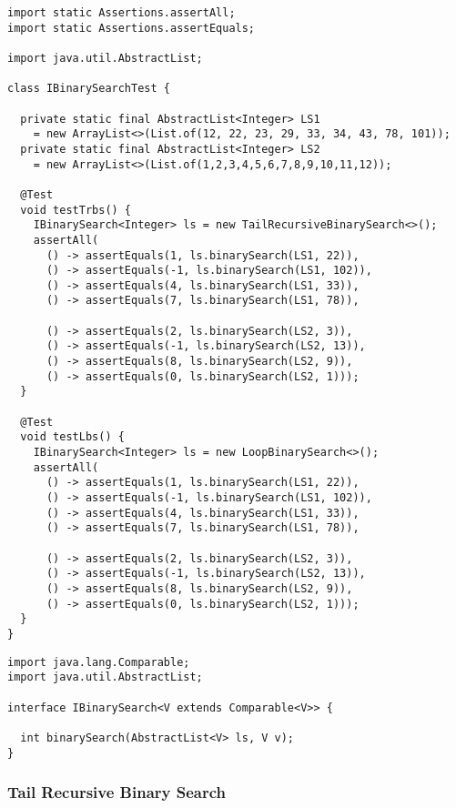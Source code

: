 \begin{lstlisting}[language=MyJava]
import static Assertions.assertAll;
import static Assertions.assertEquals;

import java.util.AbstractList;

class IBinarySearchTest {
  
  private static final AbstractList<Integer> LS1 
    = new ArrayList<>(List.of(12, 22, 23, 29, 33, 34, 43, 78, 101));
  private static final AbstractList<Integer> LS2 
    = new ArrayList<>(List.of(1,2,3,4,5,6,7,8,9,10,11,12));

  @Test
  void testTrbs() {
    IBinarySearch<Integer> ls = new TailRecursiveBinarySearch<>();
    assertAll(
      () -> assertEquals(1, ls.binarySearch(LS1, 22)),
      () -> assertEquals(-1, ls.binarySearch(LS1, 102)),
      () -> assertEquals(4, ls.binarySearch(LS1, 33)),
      () -> assertEquals(7, ls.binarySearch(LS1, 78)),

      () -> assertEquals(2, ls.binarySearch(LS2, 3)),
      () -> assertEquals(-1, ls.binarySearch(LS2, 13)),
      () -> assertEquals(8, ls.binarySearch(LS2, 9)),
      () -> assertEquals(0, ls.binarySearch(LS2, 1)));
  }
  
  @Test
  void testLbs() {
    IBinarySearch<Integer> ls = new LoopBinarySearch<>();
    assertAll(
      () -> assertEquals(1, ls.binarySearch(LS1, 22)),
      () -> assertEquals(-1, ls.binarySearch(LS1, 102)),
      () -> assertEquals(4, ls.binarySearch(LS1, 33)),
      () -> assertEquals(7, ls.binarySearch(LS1, 78)),

      () -> assertEquals(2, ls.binarySearch(LS2, 3)),
      () -> assertEquals(-1, ls.binarySearch(LS2, 13)),
      () -> assertEquals(8, ls.binarySearch(LS2, 9)),
      () -> assertEquals(0, ls.binarySearch(LS2, 1)));
  }
}
\end{lstlisting}

\begin{lstlisting}[language=MyJava]
import java.lang.Comparable;
import java.util.AbstractList;

interface IBinarySearch<V extends Comparable<V>> {
  
  int binarySearch(AbstractList<V> ls, V v);
}
\end{lstlisting}

\subsubsection*{Tail Recursive Binary Search}

